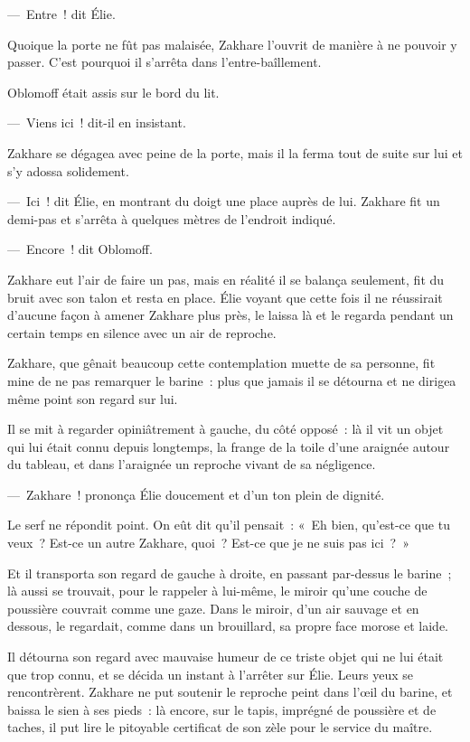 \documentclass[french,twoside]{book} %
\begin{document}
— Entre ! dit Élie.\par
Quoique la porte ne fût pas malaisée, Zakhare l’ouvrit de manière à ne pouvoir y passer. C’est pourquoi il s’arrêta dans l’entre-baîllement.\par
Oblomoff était assis sur le bord du lit.\par
— Viens ici ! dit-il en insistant.\par
Zakhare se dégagea avec peine de la porte, mais il la ferma tout de suite sur lui et s’y adossa solidement.\par
— Ici ! dit Élie, en montrant du doigt une place auprès de lui. Zakhare fit un demi-pas et s’arrêta à quelques mètres de l’endroit indiqué.\par
— Encore ! dit Oblomoff.\par
Zakhare eut l’air de faire un pas, mais en réalité il se balança seulement, fit du bruit avec son talon et resta en place. Élie voyant que cette fois il ne réussirait d’aucune façon à amener Zakhare plus près, le laissa là et le regarda pendant un certain temps en silence avec un air de reproche.\par
Zakhare, que gênait beaucoup cette contemplation muette de sa personne, fit mine de ne pas remarquer le barine : plus que jamais il se détourna et ne dirigea même point son regard sur lui.\par
Il se mit à regarder opiniâtrement à gauche, du côté opposé : là il vit un objet qui lui était connu depuis longtemps, la frange de la toile d’une araignée autour du tableau, et dans l’araignée un reproche vivant de sa négligence.\par
— Zakhare ! prononça Élie doucement et d’un ton plein de dignité.\par
Le serf ne répondit point. On eût dit qu’il pensait : « Eh bien, qu’est-ce que tu veux ? Est-ce un autre Zakhare, quoi ? Est-ce que je ne suis pas ici ? »\par
Et il transporta son regard de gauche à droite, en passant par-dessus le barine ; là aussi se trouvait, pour le rappeler à lui-même, le miroir qu’une couche de poussière couvrait comme une gaze. Dans le miroir, d’un air sauvage et en dessous, le regardait, comme dans un brouillard, sa propre face morose et laide.\par
Il détourna son regard avec mauvaise humeur de ce triste objet qui ne lui était que trop connu, et se décida un instant à l’arrêter sur Élie. Leurs yeux se rencontrèrent. Zakhare ne put soutenir le reproche peint dans l’œil du barine, et baissa le sien à ses pieds : là encore, sur le tapis, imprégné de poussière et de taches, il put lire le pitoyable certificat de son zèle pour le service du maître.\par
\end{document}
